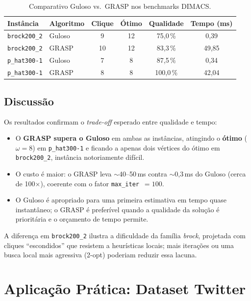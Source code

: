 \documentclass[12pt]{article}
\begin{document}
\begin{table}[ht]
\centering
\caption{Comparativo Guloso vs.\ GRASP nos benchmarks DIMACS.}
\label{tab:resultados}
\begin{tabular}{l l c c c c}
\hline
\textbf{Instância} & \textbf{Algoritmo} & \textbf{Clique} & \textbf{Ótimo}
 & \textbf{Qualidade} & \textbf{Tempo (ms)} \\
\hline
\texttt{brock200\_2} & Guloso & 9  & 12 & 75{,}0\,\%  & 0{,}39  \\
\texttt{brock200\_2} & GRASP  & 10 & 12 & 83{,}3\,\%  & 49{,}85 \\
\hline
\texttt{p\_hat300-1} & Guloso & 7  & 8  & 87{,}5\,\%  & 0{,}34  \\
\texttt{p\_hat300-1} & GRASP  & 8  & 8  & 100{,}0\,\% & 42{,}04 \\
\hline
\end{tabular}
\end{table}

\subsection{Discussão}

Os resultados confirmam o \emph{trade-off} esperado entre qualidade e tempo:

\begin{itemize}
  \item O \textbf{GRASP supera o Guloso} em ambas as instâncias, atingindo o
  \textbf{ótimo} ($\omega = 8$) em \texttt{p\_hat300-1} e ficando a apenas dois
  vértices do ótimo em \texttt{brock200\_2}, instância notoriamente difícil.
  \item O custo é maior: o GRASP leva $\sim$40--50\,ms contra $\sim$0{,}3\,ms do
  Guloso (cerca de 100$\times$), coerente com o fator \texttt{max\_iter}~$=100$.
  \item O Guloso é apropriado para uma primeira estimativa em tempo quase
  instantâneo; o GRASP é preferível quando a qualidade da solução é prioritária
  e o orçamento de tempo permite.
\end{itemize}

A diferença em \texttt{brock200\_2} ilustra a dificuldade da família
\emph{brock}, projetada com cliques ``escondidos'' que resistem a heurísticas
locais; mais iterações ou uma busca local mais agressiva (2-opt) poderiam
reduzir essa lacuna.

\section{Aplicação Prática: Dataset Twitter}
\label{sec:aplicacao}
\end{document}
